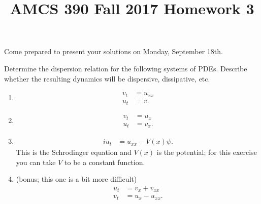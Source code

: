 \documentclass[12pt]{article}
\title{AMCS 390 Fall 2017 Homework 3}
\begin{document}
\date{}
\maketitle

Come prepared to present your solutions on Monday, September 18th.

Determine the dispersion relation for the following systems of PDEs.
Describe whether the resulting dynamics will be dispersive, dissipative, etc.
\begin{enumerate}
    \item   \begin{align*}
                v_t & = u_{xx} \\
                u_t & = v.
            \end{align*}

    \item   \begin{align*}
                v_t & = u_x \\
                u_t & = v_x.
            \end{align*}

    \item   \begin{align*}
                i u_t & = u_{xx} - V(x) \psi.
            \end{align*}
            This is the Schrodinger equation and $V(x)$ is the potential;
            for this exercise you can take $V$ to be a constant function.

    \item (bonus; this one is a bit more difficult)
            \begin{align*}
                u_t & = v_x + v_{xx} \\
                v_t & = u_x - u_{xx}.
            \end{align*}
\end{enumerate}
\end{document}
